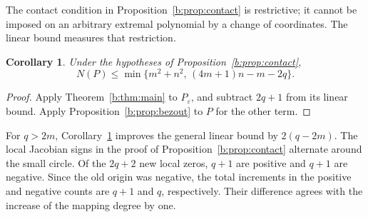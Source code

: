 \documentclass[UTF8,11pt]{ctexart}
\newtheorem{cor}[thm]{Corollary}
\theoremstyle{definition}
\numberwithin{equation}{section}
\newcommand{\eps}{\varepsilon}\newcommand{\ep}{\varepsilon}
\begin{document}
The contact condition in Proposition~\ref{b:prop:contact} is restrictive;
it cannot be imposed on an arbitrary extremal polynomial by a change
of coordinates. The linear bound measures that restriction.
\begin{cor}\label{b:cor:contactbound}
Under the hypotheses of Proposition~\ref{b:prop:contact},
\[
 N(P)\le
 \min\{m^2+n^2,\,(4m+1)n-m-2q\}.
\]
\end{cor}
\begin{proof}
Apply Theorem~\ref{b:thm:main} to $P_\eps$, and subtract $2q+1$
from its linear bound. Apply Proposition~\ref{b:prop:bezout} to $P$
for the other term.
\end{proof}

For $q>2m$, Corollary~\ref{b:cor:contactbound} improves the general
linear bound by $2(q-2m)$. The local Jacobian signs in the proof
of Proposition~\ref{b:prop:contact} alternate around the small
circle. Of the $2q+2$ new local zeros, $q+1$ are positive and
$q+1$ are negative. Since the old origin was negative, the total
increments in the positive and negative counts are $q+1$ and $q$,
respectively. Their difference agrees with the increase of the
mapping degree by one.
\end{document}
